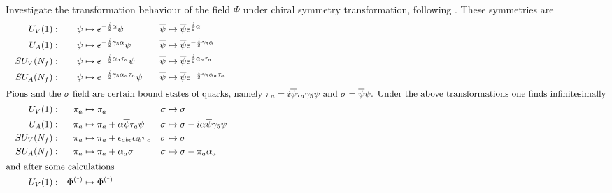 Investigate the transformation behaviour of the field $\Phi$ under chiral symmetry transformation, following \cite{Koch_1997}. These symmetries are
\begin{subequations}
    \begin{align}
         &  & U_V(1): &  & \psi             & \mapsto e^{-\frac{\imagu}{2}\alpha}\psi                                             &  \overline{\psi}&\mapsto\overline{\psi}e^{\frac{\imagu}{2}\alpha}     &&                              \\
         &  & U_A(1): &  & \psi             & \mapsto e^{-\frac{\imagu}{2}\gamma_5\alpha}\psi                                     &  \overline{\psi}      & \mapsto \overline{\psi}e^{-\frac{\imagu}{2}\gamma_5\alpha} &&                                \\
         &  & SU_V(N_f): &  & \psi             & \mapsto e^{-\frac{\imagu}{2}\alpha_a\tau_a}\psi                                             &  \overline{\psi}&\mapsto\overline{\psi}e^{\frac{\imagu}{2}\alpha_a\tau_a}     &&                              \\
         &  & SU_A(N_f): &  & \psi             & \mapsto e^{-\frac{\imagu}{2}\gamma_5\alpha_a\tau_a}\psi                                     &  \overline{\psi}      & \mapsto \overline{\psi}e^{-\frac{\imagu}{2}\gamma_5\alpha_a\tau_a} &&                                \\
        \intertext{Pions and the $\sigma$ field are certain bound states of quarks, namely $\pi_a=\imagu\overline{\psi}\tau_a\gamma_5\psi$ and $\sigma=\overline{\psi}\psi$. Under the above transformations one finds infinitesimally}
         &  & U_V(1): &  & \pi_a            & \mapsto\pi_a & \sigma & \mapsto\sigma               &  & \\
         &  & U_A(1): &  & \pi_a            & \mapsto\pi_a+\alpha\overline{\psi}\tau_a\psi                                                                & \sigma & \mapsto\sigma-\imagu\alpha\overline{\psi}\gamma_5\psi &  & \\
         &  & SU_V(N_f): &  & \pi_a            & \mapsto\pi_a+\epsilon_{abc}\alpha_b\pi_c                                                    & \sigma & \mapsto\sigma               &  & \\
         &  & SU_A(N_f): &  & \pi_a            & \mapsto\pi_a+\alpha_a\sigma                                                                 & \sigma & \mapsto\sigma-\pi_a\alpha_a &  & \\
        \intertext{and after some calculations}
         &  & U_V(1): &  & \Phi^{(\dagger)} & \mapsto \Phi^{(\dagger)}                                                              \\

\end{align}
\end{subequations}
